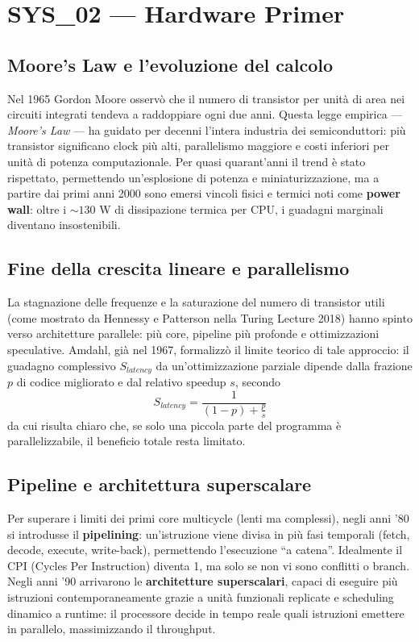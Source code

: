 \newpage
\section{SYS\_02 — Hardware Primer}

\subsection{Moore’s Law e l’evoluzione del calcolo}
Nel 1965 Gordon Moore osservò che il numero di transistor per unità di area nei circuiti integrati tendeva a raddoppiare ogni due anni.  
Questa legge empirica — \emph{Moore’s Law} — ha guidato per decenni l’intera industria dei semiconduttori: più transistor significano clock più alti, parallelismo maggiore e costi inferiori per unità di potenza computazionale.  
Per quasi quarant’anni il trend è stato rispettato, permettendo un’esplosione di potenza e miniaturizzazione, ma a partire dai primi anni 2000 sono emersi vincoli fisici e termici noti come \textbf{power wall}: oltre i $\sim130$ W di dissipazione termica per CPU, i guadagni marginali diventano insostenibili.  

\subsection{Fine della crescita lineare e parallelismo}
La stagnazione delle frequenze e la saturazione del numero di transistor utili (come mostrato da Hennessy e Patterson nella Turing Lecture 2018) hanno spinto verso architetture parallele: più core, pipeline più profonde e ottimizzazioni speculative.  
Amdahl, già nel 1967, formalizzò il limite teorico di tale approccio: il guadagno complessivo $S_{latency}$ da un’ottimizzazione parziale dipende dalla frazione $p$ di codice migliorato e dal relativo speedup $s$, secondo  
\[
S_{latency} = \frac{1}{(1 - p) + \frac{p}{s}}
\]
da cui risulta chiaro che, se solo una piccola parte del programma è parallelizzabile, il beneficio totale resta limitato.

\subsection{Pipeline e architettura superscalare}
Per superare i limiti dei primi core multicycle (lenti ma complessi), negli anni ’80 si introdusse il \textbf{pipelining}: un’istruzione viene divisa in più fasi temporali (fetch, decode, execute, write-back), permettendo l’esecuzione “a catena”.  
Idealmente il CPI (Cycles Per Instruction) diventa 1, ma solo se non vi sono conflitti o branch.  
Negli anni ’90 arrivarono le \textbf{architetture superscalari}, capaci di eseguire più istruzioni contemporaneamente grazie a unità funzionali replicate e scheduling dinamico a runtime: il processore decide in tempo reale quali istruzioni emettere in parallelo, massimizzando il throughput.


